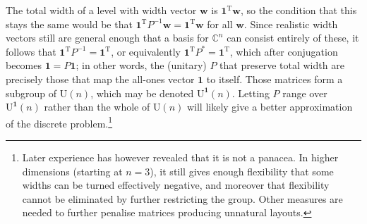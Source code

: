 \documentclass{article}
\newcommand{\C}{\mathbb{C}}
\newcommand{\transpose}[1]{#1^{\mathrm{T}}}
\newcommand{\vek}{\mathbf}
\newcommand{\UOne}{\mathrm{U}^{\vek{1}}}
\theoremstyle{definition}
\begin{document}
The total width of a level with width vector $\vek{w}$ is 
$\transpose{\vek{1}} \vek{w}$, so the condition that this stays the 
same would be that \(\transpose{\vek{1}} P^{-1} \vek{w} = 
\transpose{\vek{1}} \vek{w}\) for all $\vek{w}$. Since realistic 
width vectors still are general enough that a basis for $\C^n$ can 
consist entirely of these, it follows that \(\transpose{\vek{1}} P^{-1} 
= \transpose{\vek{1}}\), or equivalently \(\transpose{\vek{1}} P^* = 
\transpose{\vek{1}}\), which after conjugation becomes \(\vek{1} = 
P \vek{1}\); in other words, the (unitary) $P$ that preserve total 
width are precisely those that map the all-ones vector $\vek{1}$ to 
itself. Those matrices form a 
subgroup of $\mathrm{U}(n)$, which may be denoted $\UOne(n)$. Letting 
$P$ range over $\UOne(n)$ rather than the whole of $\mathrm{U}(n)$ 
will likely give a better approximation of the discrete 
problem.\footnote{
  Later experience has however revealed that it is not a panacea. In 
  higher dimensions (starting at \(n=3\)), it still gives enough 
  flexibility that some widths can be turned effectively negative, 
  and moreover that flexibility cannot be eliminated by further 
  restricting the group. Other measures are needed to further 
  penalise matrices producing unnatural layouts.
}
\end{document}
